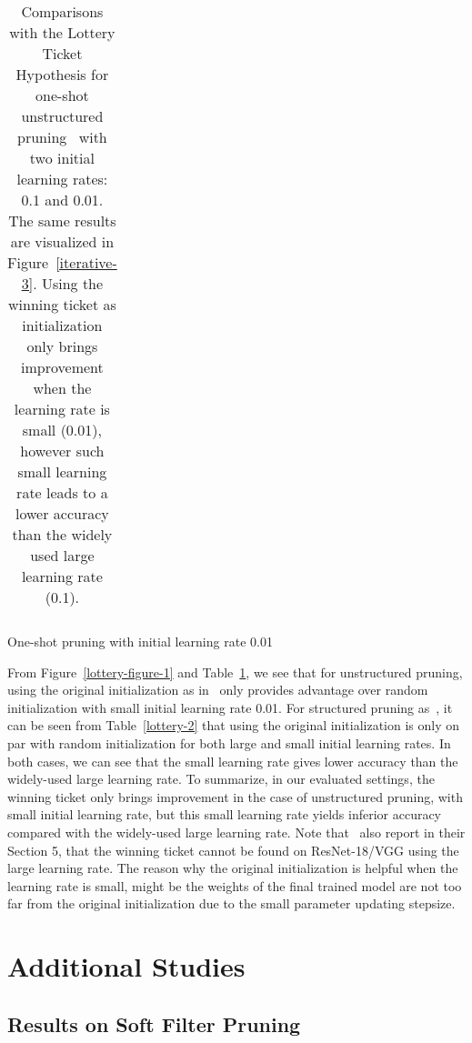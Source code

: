 \begin{table}[!htbp]
\begin{subtable}[b]{\textwidth}
\begin{tabular}{c|c|cccc}
\end{tabular}
\caption{One-shot pruning with initial learning rate 0.01}
\label{subtable-4}
\end{subtable}
\caption{Comparisons with the Lottery Ticket Hypothesis for one-shot unstructured  pruning~\cite{han2015learning} with two initial learning rates: 0.1 and 0.01. The same results are visualized in Figure~\ref{iterative-3}. Using the winning ticket as initialization only brings improvement when the learning rate is small (0.01), however such small learning rate leads to a lower accuracy than the widely used large learning rate (0.1).}
\label{lottery-1}
\end{table}





From Figure~\ref{lottery-figure-1} and Table~\ref{lottery-1}, we see that for unstructured  pruning, using the original initialization as in~\cite{lottery} only provides advantage over random initialization with small initial learning rate 0.01. For structured pruning as~\cite{li2016pruning}, it can be seen from Table~\ref{lottery-2} that using the original initialization is only on par with random initialization for both large and small initial learning rates. In both cases, we can see that the small learning rate gives lower accuracy than the widely-used large learning rate. To summarize, in our evaluated settings, the winning ticket only brings improvement in the case of unstructured pruning, with small initial learning rate, but this small learning rate yields inferior accuracy compared with the widely-used large learning rate. Note that~\cite{lottery} also report in their Section 5, that the winning ticket cannot be found on ResNet-18/VGG using the large learning rate. The reason why the original initialization is helpful when the learning rate is small, might be the weights of the final trained model are not too far from the original initialization due to the small parameter updating stepsize.



\section{Additional Studies}
\subsection{Results on Soft Filter Pruning}
\label{sec:sfp}

